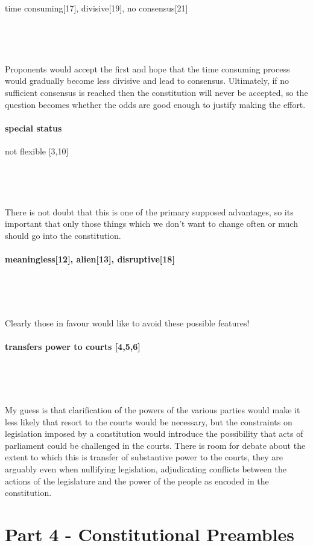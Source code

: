 \documentclass[14pt,titlepage]{extarticle}
\begin{document}
time consuming[17], divisive[19], no consensus[21]

\

\

Proponents would accept the first and hope that the time consuming process would gradually become less divisive and lead to consensus.
Ultimately, if no sufficient consensus is reached then the constitution will never be accepted, so the question becomes whether the odds are good enough to justify making the effort.

\paragraph{special status}

not flexible [3,10]

\ 

\

There is not doubt that this is one of the primary supposed advantages, so its important that only those things which we don't want to change often or much should go into the constitution.

\paragraph{meaningless[12], alien[13], disruptive[18]}

\

\

Clearly those in favour would like to avoid these possible features!

\paragraph{transfers power to courts [4,5,6]}

\

\ 

My guess is that clarification of the powers of the various parties would make it less likely that resort to the courts would be necessary, but the constraints on legislation imposed by a constitution would introduce the possibility that acts of parliament could be challenged in the courts.
There is room for debate about the extent to which this is transfer of substantive power to the courts, they are arguably even when nullifying legislation, adjudicating conflicts between the actions of the legislature and the power of the people as encoded in the constitution.


\section{Part 4 - Constitutional Preambles}\label{part4}
\end{document}
